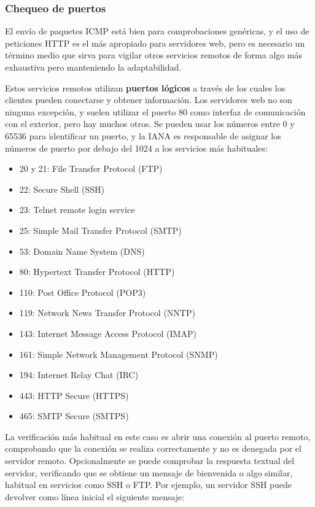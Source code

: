 \subsubsection{Chequeo de puertos}

El envío de paquetes ICMP está bien para comprobaciones genéricas, y el uso de
peticiones HTTP es el más apropiado para servidores web, pero es necesario un
término medio que sirva para vigilar otros servicios remotos de forma algo más
exhaustiva pero manteniendo la adaptabilidad.

Estos servicios remotos utilizan \textbf{puertos lógicos} a través de los cuales
los clientes pueden conectarse y obtener información. Los servidores web no son
ninguna excepción, y suelen utilizar el puerto 80 como interfaz de comunicación
con el exterior, pero hay muchos otros. Se pueden usar los números entre 0 y
65536 para identificar un puerto, y la \ac{IANA} es responsable de asignar los
números de puerto por debajo del 1024 a los servicios más habituales:

\begin{itemize}
\item 20 y 21: File Transfer Protocol (FTP)
\item 22: Secure Shell (SSH)
\item 23: Telnet remote login service
\item 25: Simple Mail Transfer Protocol (SMTP)
\item 53: Domain Name System (DNS)
\item 80: Hypertext Transfer Protocol (HTTP)
\item 110: Post Office Protocol (POP3)
\item 119: Network News Transfer Protocol (NNTP)
\item 143: Internet Message Access Protocol (IMAP)
\item 161: Simple Network Management Protocol (SNMP)
\item 194: Internet Relay Chat (IRC)
\item 443: HTTP Secure (HTTPS)
\item 465: SMTP Secure (SMTPS)
\end{itemize}

La verificación más habitual en este caso es abrir una conexión al puerto
remoto, comprobando que la conexión se realiza correctamente y no es denegada
por el servidor remoto. Opcionalmente se puede comprobar la respuesta textual
del servidor, verificando que se obtiene un mensaje de bienvenida o algo
similar, habitual en servicios como SSH o FTP. Por ejemplo, un servidor SSH
puede devolver como línea inicial el siguiente mensaje:

